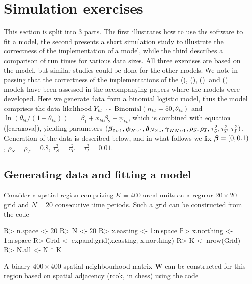 \documentclass[article, nojss]{jss}
\newcommand{\bd}[1]{\ensuremath{\mbox{\boldmath $#1$}}}
\begin{document}
\section{Simulation exercises}
This section is split into 3 parts. The first illustrates how to use the software to fit a model, the second presents a short simulation study to illustrate the correctness of the  implementation of a model, while the third describes a comparison of run times for various data sizes. All three exercises are based on the  model, but similar studies could be done for the other models. We note in passing that the correctness of the   implementations of  the  (\citealp{napier2016}),  (\citealp{rushworth2014}),  (\citealp{rushworth2016}), and  (\citealp{lee2016}) models have been assessed in the accompanying papers where the models were developed. Here we generate data from a binomial logistic model, thus the model comprises the data likelihood $Y_{kt}~\sim~\mbox{Binomial}(n_{kt}=50, \theta_{kt})$ and $\ln(\theta_{kt}/(1-\theta_{kt}))~=~\beta_1 + x_{kt}\beta_2 + \psi_{kt}$, which is combined with  equation (\ref{caranova}), yielding parameters $(\bd{\beta}_{2\times 1}, \bd{\phi}_{K\times 1}, \bd{\delta}_{N\times 1}, \bd{\gamma}_{KN\times 1}, \rho_S, \rho_T, \tau^2_S, \tau^2_T, \tau^2_I)$. Generation of the  data is described below, and in what follows we fix $\bd{\beta}=(0, 0.1)$, $\rho_S=\rho_T=0.8$, $\tau^2_S=\tau^2_T=\tau^2_I=0.01$.

\subsection{Generating data and fitting a model}
Consider a spatial region comprising $K=400$ areal units on a regular $20\times 20$ grid and $N=20$ consecutive time periods. Such a grid can be constructed from the code

\begin{Schunk}
\begin{Sinput}
R> n.space <- 20
R> N <- 20
R> x.easting <- 1:n.space
R> x.northing <- 1:n.space
R> Grid <- expand.grid(x.easting, x.northing)
R> K <- nrow(Grid)
R> N.all <- N * K
\end{Sinput}
\end{Schunk}

A binary $400\times 400$ spatial neighbourhood matrix $\mathbf{W}$ can be constructed for this region based on spatial adjacency (rook, in chess) using the code
\end{document}
